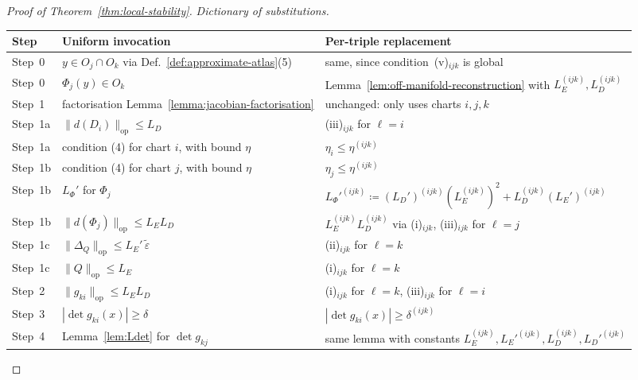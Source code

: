 \documentclass[11pt]{article}
\theoremstyle{plain}
\theoremstyle{definition}
\theoremstyle{remark}
\begin{document}
\begin{appendices}
\begin{proof}[Proof of Theorem~\ref{thm:local-stability}]
\medskip

\noindent
\emph{Dictionary of substitutions.}
\begin{center}
\centering
\small
\begin{tabularx}{\textwidth}{lXX}
\toprule
Step & Uniform invocation & Per-triple replacement \\
\midrule
Step~0 & $y \in O_j \cap O_k$ via Def.~\ref{def:approximate-atlas}(5) 
& same, since condition~(v)$_{ijk}$ is global \\

Step~0 & $\Phi_j(y) \in O_k$ 
& Lemma~\ref{lem:off-manifold-reconstruction} with $L_E^{(ijk)}, L_D^{(ijk)}$ \\

Step~1 & factorisation Lemma~\ref{lemma:jacobian-factorisation} 
& unchanged: only uses charts $i, j, k$ \\

Step~1a & $\|d(D_i)\|_{\mathrm{op}} \leq L_D$ 
& (iii)$_{ijk}$ for $\ell = i$ \\

Step~1a & condition (4) for chart $i$, with bound $\eta$ 
& $\eta_i \leq \eta^{(ijk)}$ \\

Step~1b & condition (4) for chart $j$, with bound $\eta$ 
& $\eta_j \leq \eta^{(ijk)}$ \\

Step~1b & $L_\Phi'$ for $\Phi_j$ 
& $L_\Phi'^{(ijk)} \coloneqq (L_D')^{(ijk)}(L_E^{(ijk)})^2 + L_D^{(ijk)}(L_E')^{(ijk)}$ \\

Step~1b & $\|d(\Phi_j)\|_{\mathrm{op}} \leq L_E L_D$ 
& $L_E^{(ijk)} L_D^{(ijk)}$ via (i)$_{ijk}$, (iii)$_{ijk}$ for $\ell = j$ \\

Step~1c & $\|\Delta_Q\|_{\mathrm{op}} \leq L_E'\,\widetilde\varepsilon$ 
& (ii)$_{ijk}$ for $\ell = k$ \\

Step~1c & $\|Q\|_{\mathrm{op}} \leq L_E$ 
& (i)$_{ijk}$ for $\ell = k$ \\

Step~2 & $\|g_{ki}\|_{\mathrm{op}} \leq L_E L_D$ 
& (i)$_{ijk}$ for $\ell = k$, (iii)$_{ijk}$ for $\ell = i$ \\

Step~3 & $|\det g_{ki}(x)| \geq \delta$ 
& $|\det g_{ki}(x)| \geq \delta^{(ijk)}$ \\

Step~4 & Lemma~\ref{lem:Ldet} for $\det g_{kj}$ 
& same lemma with constants $L_E^{(ijk)}, L_E'^{(ijk)}, L_D^{(ijk)}, L_D'^{(ijk)}$ \\


\end{tabularx}
\end{center}
\end{proof}
\end{appendices}
\end{document}
